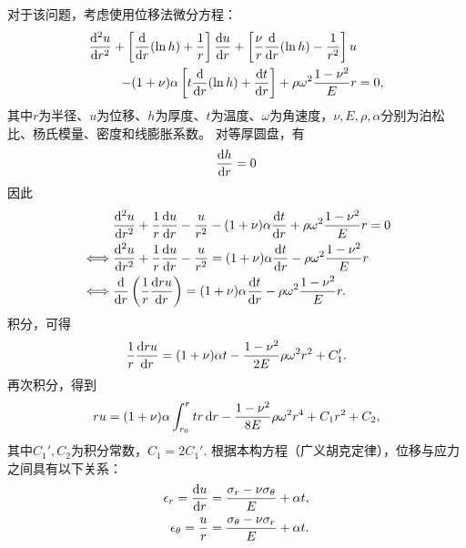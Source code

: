 对于该问题，考虑使用位移法微分方程：
\begin{equation}
    \begin{aligned}
        \frac{\dif^2 u}{\dif r^2} + \left[ \frac{\dif}{\dif r} (\ln h )+ \frac{1}{r} \right] \frac{\dif u}{\dif r} + 
        \left[\frac{\nu}{r}\frac{\dif}{\dif r} (\ln h) - \frac{1}{r^2}\right] u & \\ 
        - (1 + \nu) \alpha \left[ t \frac{\dif}{\dif r} (\ln h) + \frac{\dif t}{\dif r}\right] +
        \rho \omega^2 \frac{1 - \nu^2}{E} r &= 0,
    \end{aligned}
\end{equation}
其中$r$为半径、$u$为位移、$h$为厚度、$t$为温度、$\omega$为角速度，$\nu, E, \rho, \alpha$分别为泊松比、杨氏模量、密度和线膨胀系数。
对等厚圆盘，有
\begin{equation}
    \frac{\mathop{} \! \mathrm{d} h}{\mathop{} \! \mathrm{d} r} = 0
\end{equation}
因此
\begin{equation}
    \begin{aligned}
        & \frac{\dif^2 u}{\dif r^2} + \frac{1}{r} \frac{\dif u}{\dif r} - \frac{u}{r^2} - (1 + \nu) \alpha \frac{\dif t}{\dif r} + \rho \omega^2 \frac{1 - \nu^2}{E} r = 0 \\
        \iff & \frac{\dif^2 u}{\dif r^2} + \frac{1}{r} \frac{\dif u}{\dif r} - \frac{u}{r^2} = (1 + \nu) \alpha \frac{\dif t}{\dif r} - \rho \omega^2 \frac{1 - \nu^2}{E} r \\
        \iff & \frac{\dif}{\dif r}\left( \frac{1}{r} \frac{\dif ru}{\dif r} \right) = (1 + \nu) \alpha \frac{\dif t}{\dif r} - \rho \omega^2 \frac{1 - \nu^2}{E} r.
    \end{aligned}
\end{equation}
积分，可得
\begin{equation}
    \frac{1}{r} \frac{\mathop{} \! \mathrm{d} ru}{\mathop{} \! \mathrm{d} r} = (1 + \nu) \alpha t- \frac{1 - \nu^2}{2E} \rho \omega^2 r^2 + C_1'.
\end{equation}
再次积分，得到
\begin{equation}
    ru = (1 + \nu) \alpha \int_{r_0}^r tr \mathop{} \! \mathrm{d} r - \frac{1 - \nu^2}{8E} \rho \omega^2 r^4 + C_1 r^2 + C_2,
\end{equation}
其中$C_1', C_2$为积分常数，$C_1 = 2C_1'$.
根据本构方程（广义胡克定律），位移与应力之间具有以下关系：
\begin{equation}
    \begin{aligned}
        \epsilon_r = \frac{\mathop{} \! \mathrm{d} u}{\mathop{} \! \mathrm{d} r} &= \frac{\sigma_r - \nu \sigma_\theta}{E} + \alpha t, \\
        \epsilon_\theta = \frac{u}{r} &= \frac{\sigma_\theta - \nu \sigma_r}{E} + \alpha t.
    \end{aligned}
\end{equation}
